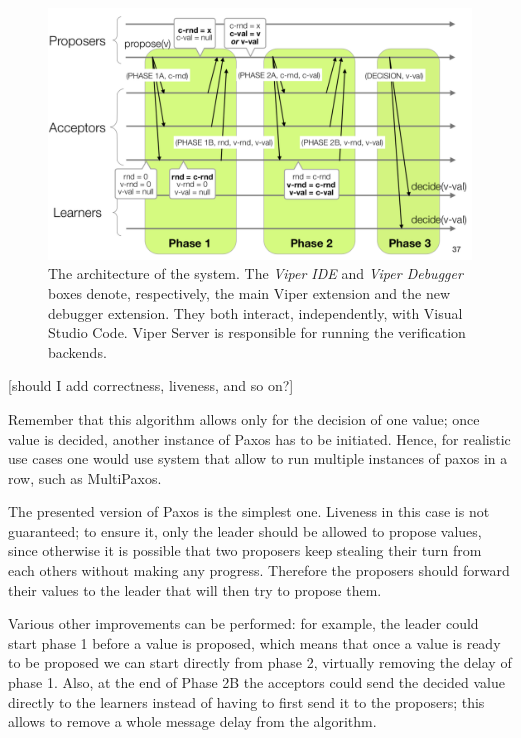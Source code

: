 \begin{figure}[htb]
\centering
\includegraphics{img/paxos.png}
\caption[The architecture of the system]{ The architecture of the system. The
  \textit{Viper IDE} and \textit{Viper Debugger} boxes denote, respectively,
  the main Viper extension and the new debugger extension. They both interact,
  independently, with Visual Studio Code. Viper Server is responsible for
  running the verification backends.}
\label{fig:paxos}
\end{figure}

[should I add correctness, liveness, and so on?]

Remember that this algorithm allows only for the decision of one value; once value is decided, another instance of Paxos has to be initiated. Hence, for realistic use cases one would use system that allow to run multiple instances of paxos in a row, such as MultiPaxos.

The presented version of Paxos is the simplest one. Liveness in this case is not guaranteed; to ensure it, only the leader should be allowed to propose values, since otherwise it is possible that two proposers keep stealing their turn from each others without making any progress. Therefore the proposers should forward their values to the leader that will then try to propose them.

Various other improvements can be performed: for example, the leader could start phase 1 before a value is proposed, which means that once a value is ready to be proposed we can start directly from phase 2, virtually removing the delay of phase 1.
Also, at the end of Phase 2B the acceptors could send the decided value directly to the learners instead of having to first send it to the proposers; this allows to remove a whole message delay from the algorithm.

